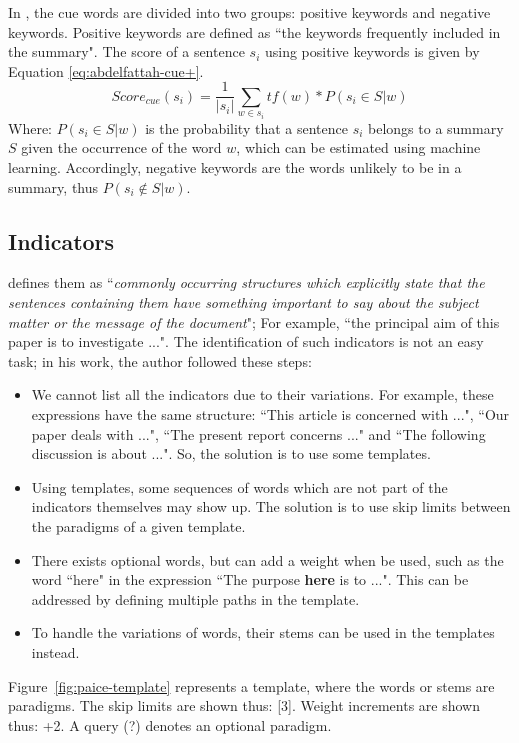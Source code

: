In \citep{09-abdelfattah-ren}, the cue words are divided into two groups: positive keywords and negative keywords.
Positive keywords are defined as ``the keywords frequently included in the summary". 
The score of a sentence $ s_i $ using positive keywords is given by Equation \ref{eq:abdelfattah-cue+}.
\begin{equation}
	\label{eq:abdelfattah-cue+}
	Score_{cue}(s_i) = \frac{1}{|s_i|} \sum_{w \in s_i}{tf(w) * P(s_i \in S | w)}
\end{equation}
Where: 
$ P(s_i \in S | w) $ is the probability that a sentence $ s_i $ belongs to a summary $ S $ given the occurrence of the word $ w $, which can be estimated using machine learning. 
Accordingly, negative keywords are the words unlikely to be in a summary, thus $ P(s_i \notin S | w) $.

\subsection{Indicators}

\citet{81-paice} defines them as ``\textit{commonly occurring structures which explicitly state that the sentences containing them have something important to say about the subject matter or the message of the document}";
For example, ``the principal aim of this paper is to investigate ...".
The identification of such indicators is not an easy task; in his work, the author followed these steps:
\begin{itemize}
	\item We cannot list all the indicators due to their variations.
	For example, these expressions have the same structure: ``This article is concerned with ...", ``Our paper deals with ...", ``The present report concerns ..." and ``The following discussion is about ...". 
	So, the solution is to use some templates.
	
	\item Using templates, some sequences of words which are not part of the indicators themselves may show up.
	The solution is to use skip limits between the paradigms of a given template.
	
	\item There exists optional words, but can add a weight when be used, such as the word ``here" in the expression ``The purpose \textbf{here} is to ...". 
	This can be addressed by defining multiple paths in the template.
	
	\item To handle the variations of words, their stems can be used in the templates instead.
	
\end{itemize}
Figure~\ref{fig:paice-template} represents a template, where the words or stems are paradigms.
The skip limits are shown thus: [3].
Weight increments are shown thus: +2.
A query (?) denotes an optional paradigm. 

